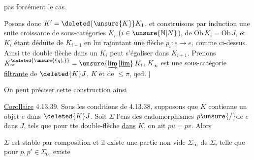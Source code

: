 pas forcément le cas.


Posons donc  $K'=\deleted{\unsure{K}}K_1$, et construisons par induction une suite croissante de sous-catégories $K_i$ ($i\in\unsure{\mathbb{N}|N}$), de $\mathrm{Ob}\,K_i=\mathrm{Ob}\,J$, et $K_i$  étant déduite de $K_{i-1}$ en lui rajoutant  une flèche $p_i:e\longrightarrow e$, comme ci-dessus. Ainsi tte double flèche dans un $K_i$ peut s'égaliser dans $K_{i+1}$. Prenons $K_{\infty}^{\deleted{\unsure{\prime|q|,}}}=\unsure{\varinjlim|\underline{\lim}}\,K_i$, $K_{\infty}$ est une sous-catégorie \uline{filtrante} de $\deleted{K}J$,  $K$ et de  $\leq\pi$,  qed. $\big]$

On peut préciser cette construction ainsi

\uline{Corollaire} 4.13.39. Sous les conditions de 4.13.38, supposons que $K$ contienne un objet $e$  dans $\deleted{K}J$. Soit $\Sigma$ l'ens des endomorphismes $p\unsure{/}$de $e$ dans $J$, tels que
pour tte double-flèche  \uline{dans} $K$, on
ait $pu=pv$.  Alors

 $\Sigma$ est stable par composition et il existe une partie non vide $\Sigma_{\infty}$ de $\Sigma$, telle que  pour  $p,p'\in\Sigma_0$, existe
